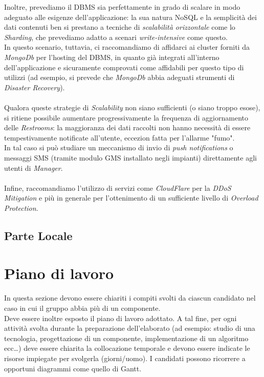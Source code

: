 \documentclass[12pt]{article}
\begin{document}
Inoltre, prevediamo il DBMS sia perfettamente in grado di scalare in modo adeguato alle esigenze dell'applicazione: la sua natura NoSQL e la semplicità dei dati contenuti ben si prestano a tecniche di \textit{scalabilità orizzontale} come lo \textit{Sharding}, che prevediamo adatto a scenari \textit{write-intensive} come questo.\\
In questo scenario, tuttavia, ci raccomandiamo di affidarci ai cluster  forniti da \textit{MongoDb} per l'hosting del DBMS, in quanto già integrati all'interno dell'applicazione e sicuramente comprovati come affidabili per questo tipo di utilizzi (ad esempio, si prevede che \textit{MongoDb} abbia adeguati strumenti di \textit{Disaster Recovery}).\\\\
Qualora queste strategie di \textit{Scalability} non siano sufficienti (o siano troppo esose), si ritiene possibile aumentare progressivamente la frequenza di aggiornamento delle \textit{Restrooms}: la maggioranza dei dati raccolti non hanno necessità di essere tempestivamente notificate all'utente, eccezion fatta per l'allarme "fumo".\\ 
In tal caso si può studiare un meccanismo di invio di \textit{push notifications} o messaggi SMS (tramite modulo GMS installato negli impianti) direttamente agli utenti di \textit{Manager}.\\\\
Infine, raccomandiamo l'utilizzo di servizi come \textit{CloudFlare} per la \textit{DDoS Mitigation} e più in generale per l'ottenimento di un sufficiente livello di \textit{Overload Protection}.
\subsection{Parte Locale}

\newpage

\section{Piano di lavoro}

In questa sezione devono essere chiariti i compiti svolti da ciascun candidato nel caso in cui il gruppo abbia più di un componente.\\

Deve essere inoltre esposto il piano di lavoro adottato. A tal fine, per ogni attività svolta durante la preparazione dell'elaborato (ad esempio: studio di una tecnologia, progettazione di un componente, implementazione di un algoritmo ecc…) deve essere chiarita la collocazione temporale e devono essere indicate le risorse impiegate per svolgerla (giorni/uomo). I candidati possono ricorrere a opportuni diagrammi come quello di Gantt.\\
\end{document}
